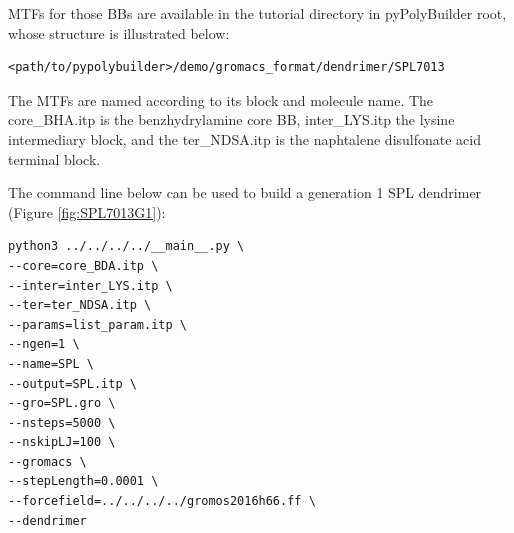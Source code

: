 MTFs for those BBs are available in the tutorial directory in pyPolyBuilder root, whose structure is illustrated below:
\begin{lstlisting}
<path/to/pypolybuilder>/demo/gromacs_format/dendrimer/SPL7013
\end{lstlisting}

The MTFs are named according to its block and molecule name.
The core\_BHA.itp is the benzhydrylamine core BB, inter\_LYS.itp the lysine intermediary block, and the ter\_NDSA.itp is the naphtalene disulfonate acid terminal block.

The command line below can be used to build a generation 1 SPL dendrimer (Figure \ref{fig:SPL7013G1}):

\begin{lstlisting}
python3 ../../../../__main__.py \
--core=core_BDA.itp \
--inter=inter_LYS.itp \
--ter=ter_NDSA.itp \
--params=list_param.itp \
--ngen=1 \
--name=SPL \
--output=SPL.itp \
--gro=SPL.gro \
--nsteps=5000 \
--nskipLJ=100 \
--gromacs \
--stepLength=0.0001 \
--forcefield=../../../../gromos2016h66.ff \
--dendrimer
\end{lstlisting}

